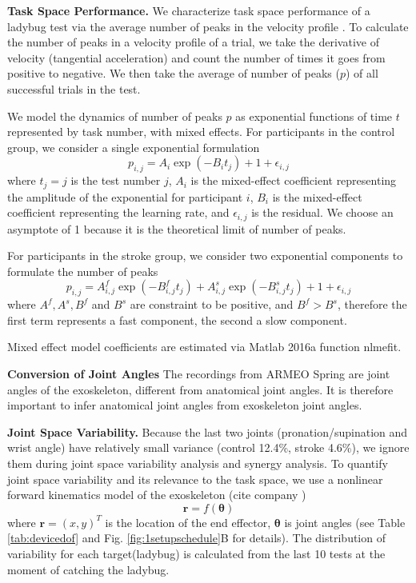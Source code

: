 \textbf{Task Space Performance.}
We characterize task space performance of a ladybug test via the average number of peaks in the velocity profile \cite{}. 
To calculate the number of peaks in a velocity profile of a trial, we take the derivative of velocity (tangential acceleration) and count the number of times it goes from positive to negative.
We then take the average of number of peaks ($ p $) of all successful trials in the test.

We model the dynamics of number of peaks $ p $ as exponential functions of time $ t $ represented by task number, with mixed effects.
For participants in the control group, we consider a single exponential formulation
\begin{equation}\label{eqn:singleexp}
p_{i,j} = A_i \exp(-B_i t_{j}) + 1 + \epsilon_{i,j}
\end{equation}
where $ t_{j} = j $ is the test number $ j $, 
$ A_i $ is the mixed-effect coefficient representing the amplitude of the exponential for participant $ i $,
$ B_i $ is the mixed-effect coefficient representing the learning rate,
and $ \epsilon_{i,j} $ is the residual. 
We choose an asymptote of 1 because it is the theoretical limit of number of peaks.

For participants in the stroke group, we consider two exponential components to formulate the number of peaks
\begin{equation}\label{eqn:doubleexp}
p_{i,j} = A^f_{i,j} \exp(-B^f_{i,j} t_j) + A^s_{i,j} \exp(-B^s_{i,j} t_j) + 1 + \epsilon_{i,j}
\end{equation}
where $ A^f, A^s, B^f $ and $ B^s $ are constraint to be positive, and $ B^f > B^s $, therefore the first term represents a fast component, the second a slow component.

Mixed effect model coefficients are estimated via Matlab 2016a function \textsf{nlmefit}.

\textbf{Conversion of Joint Angles}
The recordings from ARMEO Spring are joint angles of the exoskeleton, different from anatomical joint angles.
It is therefore important to infer anatomical joint angles from exoskeleton joint angles. 

\textbf{Joint Space Variability.}
Because the last two joints (pronation/supination and wrist angle) have relatively small variance (control 12.4\%, stroke 4.6\%), we ignore them during joint space variability analysis and synergy analysis.
To quantify joint space variability and its relevance to the task space, we use a nonlinear forward kinematics model of the exoskeleton (cite company \cite{})
	\begin{equation}\label{eqn:nonlinearForwardKinematics}
	\bm{r} = f(\bm{\theta})
	\end{equation}
where $ \bm{r} = (x,y)^T $ is the location of the end effector, $ \bm{\theta} $ is joint angles (see Table \ref{tab:devicedof} and Fig. \ref{fig:1setupschedule}B for details). 
The distribution of variability for each target(ladybug) is calculated from the last 10 tests at the moment of catching the ladybug. 

